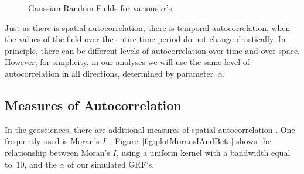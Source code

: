 \documentclass[ijgi,article,submit,moreauthors,pdftex,10pt,a4paper]{Definitions/mdpi}
\begin{document}
\begin{figure}[H]
\hspace{8mm}
\caption{Gaussian Random Fields for various $\alpha$'s}
\label{fig:GaussianRandomField}
\end{figure}

Just as there is spatial autocorrelation, there is temporal autocorrelation, when the values of the field over the entire time period do not change drastically. In principle, there can be different levels of autocorrelation over time and over space. However, for simplicity, in our analyses we will use the same level of autocorrelation in all directions, determined by parameter~$\alpha$.

\subsection{Measures of Autocorrelation}
\label{sec:Materials and Methods/Measures of Autocorrelation}

In the geosciences, there are additional measures of spatial autocorrelation \cite{Eshel2011, Storch1999}. One frequently used is Moran's $I$~\cite{Moran1950, Hubert1981, PySAL}. Figure~\ref{fig:plotMoransIAndBeta} shows the relationship between Moran's $I$, using a uniform kernel with a bandwidth equal to~$10$, and the $\alpha$ of our simulated GRF's.
\end{document}
